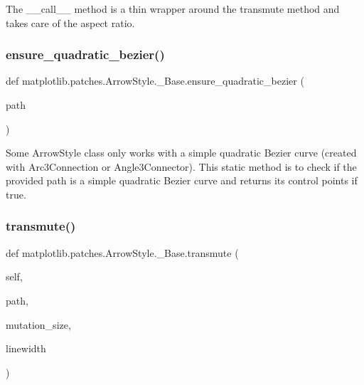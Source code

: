 \begin{DoxyVerb}The __call__ method is a thin wrapper around the transmute method
and takes care of the aspect ratio.
\end{DoxyVerb}
 \mbox{\label{classmatplotlib_1_1patches_1_1ArrowStyle_1_1__Base_a71cf7a38dd76269d0de075449ea799ba}} 
\subsubsection{\texorpdfstring{ensure\+\_\+quadratic\+\_\+bezier()}{ensure\_quadratic\_bezier()}}
{\footnotesize\ttfamily def matplotlib.\+patches.\+Arrow\+Style.\+\_\+\+Base.\+ensure\+\_\+quadratic\+\_\+bezier (\begin{DoxyParamCaption}\item[{}]{path }\end{DoxyParamCaption})\hspace{0.3cm}{\ttfamily [static]}}

\begin{DoxyVerb}Some ArrowStyle class only works with a simple quadratic Bezier
curve (created with Arc3Connection or Angle3Connector). This static
method is to check if the provided path is a simple quadratic
Bezier curve and returns its control points if true.
\end{DoxyVerb}
 \mbox{\label{classmatplotlib_1_1patches_1_1ArrowStyle_1_1__Base_ae476ccd3f777a9e6f457106ce7ee0de7}} 
\subsubsection{\texorpdfstring{transmute()}{transmute()}}
{\footnotesize\ttfamily def matplotlib.\+patches.\+Arrow\+Style.\+\_\+\+Base.\+transmute (\begin{DoxyParamCaption}\item[{}]{self,  }\item[{}]{path,  }\item[{}]{mutation\+\_\+size,  }\item[{}]{linewidth }\end{DoxyParamCaption})}

